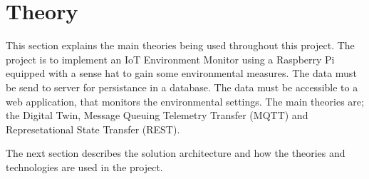 \section{Theory} \label{sec:theory}
This section explains the main theories being used throughout this project. The project is to implement an IoT Environment Monitor using a Raspberry Pi equipped with a sense hat to gain some environmental measures. The data must be send to server for persistance in a database. The data must be accessible to a web application, that monitors the environmental settings. The main theories are; the Digital Twin, Message Queuing Telemetry Transfer (MQTT) and Represetational State Transfer (REST).  






The next section describes the solution architecture and how the theories and technologies are used in the project. 